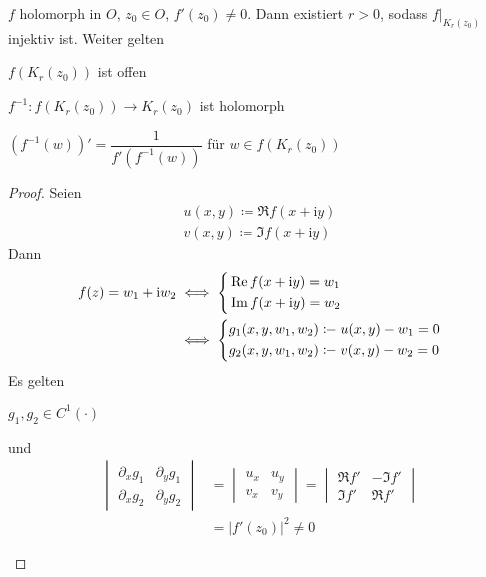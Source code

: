 \begin{theorem} \label{thm:3.6}
  $f$ holomorph in $O$, $z_0 \in O$, $f'(z_0) \neq 0$. Dann existiert $r > 0$, sodass $f\Big|_{K_r(z_0)}$ injektiv ist. Weiter gelten
  \begin{item-triangle}
    \item $f(K_r(z_0))$ ist offen
    
    \item $f^{-1} : f(K_r(z_0)) \to K_r(z_0)$ ist holomorph
    
    \item $(f^{-1}(w))' = \dfrac{1}{f'(f^{-1}(w))}$ für $w \in f(K_r(z_0))$
  \end{item-triangle}
  
  \begin{proof}
    Seien
    \begin{align*}
      u(x,y) \coloneq \Re f(x+\mathrm{i}y) \\
      v(x,y) \coloneq \Im f(x+\mathrm{i}y)
    \end{align*}
    Dann
    \begin{align*}
      f(z) = w_1 + \mathrm{i} w_2 &\iff
      \begin{dcases}
        \Re f(x+\mathrm{i}y) = w_1 \\
        \Im f(x+\mathrm{i}y) = w_2
      \end{dcases}
      \\
      &\iff
      \begin{dcases}
        g_1(x,y,w_1,w_2) \coloneq u(x,y) - w_1 = 0 \\
        g_2(x,y,w_1,w_2) \coloneq v(x,y) - w_2 = 0
      \end{dcases}
    \end{align*}
    Es gelten
    \begin{enum-arab}
      \item $g_1,g_2 \in C^1(\cdot)$
      
      \item und
      \begin{align*}
        \begin{vmatrix}
          \partial_x g_1 & \partial_y g_1 \\
          \partial_x g_2 & \partial_y g_2
        \end{vmatrix}
        &=
        \begin{vmatrix}
          u_x & u_y \\
          v_x & v_y
        \end{vmatrix}
        =
        \begin{vmatrix}
          \Re f' & -\Im f' \\
          \Im f' & \Re f'
        \end{vmatrix}
        \\
        &= |f'(z_0)|^2 \neq 0
      \end{align*}
      

\end{enum-arab}
\end{proof}
\end{theorem}
